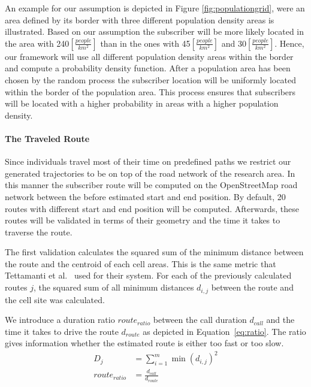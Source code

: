 \documentclass[twocolumn]{bmcart}%
\begin{document}
An example for our assumption is depicted in Figure \ref{fig:populationgrid}, were an area defined by its border with three different population density areas is illustrated. Based on our assumption the subscriber will be more likely located in the area with 240$[\frac{people}{km^2}]$ than in the ones with 45$[\frac{people}{km^2}]$ and 30$[\frac{people}{km^2}]$. Hence, our framework will use all different population density areas within the border and compute a probability density function. After a population area has been chosen by the random process the subscriber location will be uniformly located within the border of the population area. This process ensures that subscribers will be located with a higher probability in areas with a higher population density.
\paragraph{The Traveled Route}
Since individuals travel most of their time on predefined paths we restrict our generated trajectories to be on top of the road network of the research area. In this manner the subscriber route will be computed on the OpenStreetMap road network between the before estimated start and end position. By default, 20 routes with different start and end position will be computed. Afterwards, these routes will be validated in terms of their geometry and the time it takes to traverse the route.

The first validation calculates the squared sum of the minimum distance between the route and the centroid of each cell areas. This is the same metric that Tettamanti et al.~\cite{Tettamanti2012} used for their system. For each of the previously calculated routes $j$, the squared sum of all minimum distances $d_{i,j}$ between the
route and the cell site was calculated.

We introduce a duration ratio $route_{ratio}$ between the call duration $d_{call}$ and the time it takes to drive the route $d_{route}$ as depicted in Equation~\ref{eq:ratio}. The ratio gives information whether the estimated route is either too fast or too slow. 
\begin{align}
D_j &=\sum_{i=1}^{m} \min(d_{i,j})^{2} \label{eq:sumsquaremine} \\
route_{ratio} &=\frac{d_{call}}{d_{route}} \label{eq:ratio}
\end{align} 
\end{document}
